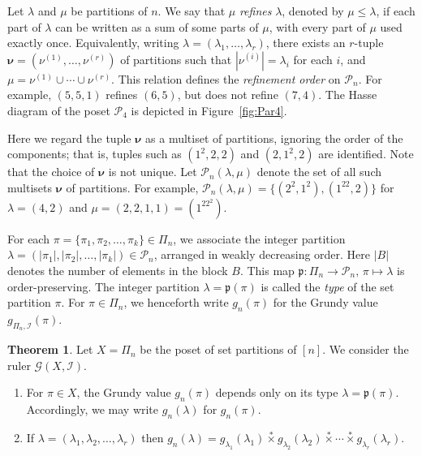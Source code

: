 \documentclass[a4paper,11pt]{amsart}
\theoremstyle{definition}
\newtheorem{thm}{Theorem}[section]
\newcommand{\nimmul}{\overset{*}{\times}}
\numberwithin{equation}{section}
\def\Par{\mathscr{P}}
\def\Pgame{\mathscr{G}}
\def\I{\mathscr{I}}
\def\fnb{\mathfrak{p}}
\def\bnu{\boldsymbol{\nu}}
\begin{document}
%
\par
%
Let $\lambda$ and $\mu$ be partitions of $n$. 
We say that $\mu$ \textsl{refines} $\lambda$,
denoted by $\mu\leq\lambda$, 
if each part of $\lambda$ can be written as a sum of some parts of $\mu$,
with every part of $\mu$ used exactly once.
Equivalently, writing $\lambda=(\lambda_{1},\dots,\lambda_{r})$, 
there exists an $r$-tuple $\bnu=(\nu^{(1)},\dots,\nu^{(r)})$ of partitions such that $|\nu^{(i)}|=\lambda_{i}$ for each $i$, 
and $\mu=\nu^{(1)}\cup\cdots\cup\nu^{(r)}$.
This relation defines the \textsl{refinement order} on $\Par_{n}$.
For example, $(5,5,1)$ refines $(6,5)$, but does not refine $(7,4)$.
The Hasse diagram of the poset $\Par_{4}$ is depicted in Figure~\ref{fig:Par4}.
%
\par\smallskip
%
Here we regard the tuple $\bnu$ as a multiset of partitions, 
ignoring the order of the components; 
that is, tuples such as $(1^2,2,2)$ and $(2,1^2,2)$ are identified.
Note that the choice of $\bnu$ is not unique.
Let $\Par_{n}(\lambda,\mu)$ denote the set of all such multisets $\bnu$ of partitions.
For example, 
$\Par_{n}(\lambda,\mu)=\{(2^2,1^2),(1^22,2)\}$ for $\lambda=(4,2)$ and $\mu=(2,2,1,1)=(1^22^2)$.
%
\par\smallskip
%
For each $\pi=\{\pi_{1},\pi_{2},\dots,\pi_{k}\}\in\Pi_{n}$, 
we associate the integer partition $\lambda=(|\pi_{1}|,|\pi_{2}|,\dots,|\pi_{k}|)\in\Par_{n}$,
 arranged in weakly decreasing order.
Here $|B|$ denotes the number of elements in the block $B$.
This map $\fnb:\Pi_{n}\to\Par_{n},\,\pi \mapsto \lambda$ is order-preserving.
%
The integer partition $\lambda=\fnb(\pi)$ is called the \textsl{type} of the set partition $\pi$.
%
For $\pi\in\Pi_{n}$, we henceforth write $g_{n}(\pi)$ for the Grundy value $g_{\Pi_{n},\I}(\pi)$.
%
%
%
\begin{thm}\label{th:SetParGrundy}
%
Let $X=\Pi_{n}$ be the poset of set partitions of $[n]$.
We consider the ruler $\Pgame(X,\I)$.
%
\begin{enumerate}[label=(\roman*)]
%
\item\label{it:Pi-1}
For $\pi\in X$, the Grundy value $g_{n}(\pi)$ depends only on its type $\lambda=\fnb(\pi)$.
Accordingly, we may write $g_{n}(\lambda)$ for $g_{n}(\pi)$.
%
\item\label{it:Pi-2}
If $\lambda=(\lambda_{1},\lambda_{2},\dots,\lambda_{r})$ then
$g_{n}(\lambda)=g_{\lambda_{1}}(\lambda_{1})\nimmul g_{\lambda_{2}}(\lambda_{2})\nimmul\cdots \nimmul g_{\lambda_{r}}(\lambda_{r})$.
%
\end{enumerate}
%
\end{thm}
\end{document}
